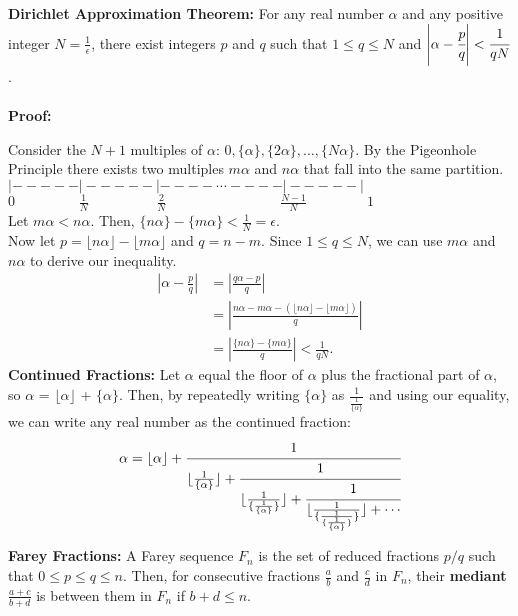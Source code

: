 \documentclass[11pt]{article}
\begin{document}
\newpage
\textbf{Dirichlet Approximation Theorem:} For any real number $\alpha$ and any positive integer $N=\frac{1}{\epsilon}$, there exist integers $p$ and $q$ such that $1 \leq q \leq N$ and $\left| \alpha - \cfrac{p}{q} \right| < \cfrac{1}{qN}$.
\\\\
\textbf{Proof:}

Consider the $N+1$ multiples of $\alpha$: $0, \{ \alpha \}, \{ 2\alpha \}, \dots, \{ N\alpha \}$.
By the Pigeonhole Principle there exists two multiples $m\alpha$ and $n\alpha$ that fall into the same partition.\\


$|-----|-----|---- \cdots ----|-----|$\\
$0\phantom{----..}\frac{1}{N}\phantom{----...}\frac{2}{N}\phantom{-----.}\phantom{---.}\frac{N-1}{N}\phantom{----.}1$ \\
 
Let $m\alpha < n\alpha$. Then, $\{ n\alpha \} - \{ m\alpha \} < \frac{1}{N} = \epsilon$.\\

Now let $p = \lfloor n\alpha \rfloor - \lfloor m\alpha \rfloor$ and $q = n - m$. Since $1 \leq q \leq N$, we can use $m\alpha$ and $n\alpha$ to derive our inequality.
\begin{align*}
    \left| \alpha - \frac{p}{q} \right| &= \left| \frac{q\alpha - p}{q} \right| \\
    &= \left| \frac{n\alpha - m\alpha - (\lfloor n\alpha \rfloor - \lfloor m\alpha \rfloor)}{q} \right| \\
    &= \left| \frac{\{ n\alpha \} - \{ m\alpha \}}{q} \right| < \frac{1}{qN}.
\end{align*}
\textbf{Continued Fractions:} Let $\alpha$ equal the floor of $\alpha$ plus the fractional part of $\alpha$, so $\alpha$ = $\lfloor\alpha\rfloor$ + $\{\alpha\}$. Then, by repeatedly writing $\{\alpha\}$ as $\frac{1}{\frac{1}{\{\alpha\}}}$ and using our equality, we can write any real number as the continued fraction:
\[
\alpha=\lfloor\alpha\rfloor+
\cfrac{1}{\lfloor\frac{1}{\{\alpha\}}\rfloor
+\cfrac{1}{\lfloor\frac{1}{\{\frac{1}{\{\alpha\}}\}}\rfloor
+\cfrac{1}{\lfloor\frac{1}{\{\frac{1}{\{\frac{1}{\{\alpha\}}\}}\}}\rfloor
+\cdots}}}
\]

\newpage
\textbf{Farey Fractions:} A Farey sequence $F_n$ is the set of reduced fractions $p/q$ such that $0\leq p \leq q \leq n$. Then, for consecutive fractions $\frac{a}{b}$ and $\frac{c}{d}$ in $F_n$, their \textbf{mediant} $\frac{a+c}{b+d}$ is between them in $F_n$ if $b+d \leq n$.\\
\end{document}
